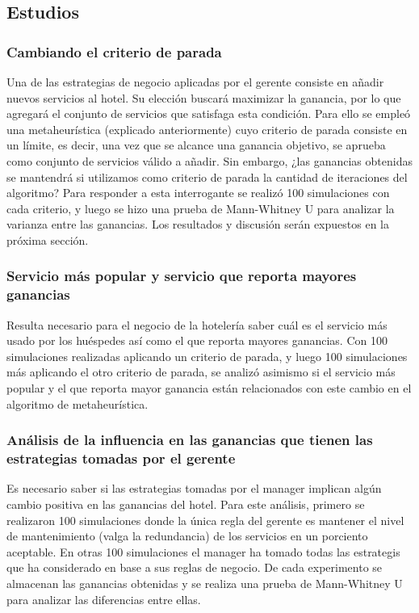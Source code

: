 \documentclass[12pt,a4paper]{article} \usepackage[spanish]{babel} \usepackage{graphicx} \usepackage{amsmath} \usepackage{amsfonts} \usepackage{amssymb} \usepackage{float} \usepackage{geometry}
\begin{document}
\subsection{Estudios}
\subsubsection{Cambiando el criterio de parada}
Una de las estrategias de negocio aplicadas por el gerente consiste en añadir nuevos servicios al hotel. Su elección buscará maximizar la ganancia, por lo que agregará el conjunto de servicios que satisfaga esta condición. Para ello se empleó una metaheurística (explicado anteriormente) cuyo criterio de parada consiste en un límite, es decir, una vez que se alcance una ganancia objetivo, se aprueba como conjunto de servicios válido a añadir. Sin embargo, ¿las ganancias obtenidas se mantendrá si utilizamos como criterio de parada la cantidad de iteraciones del algoritmo? Para responder a esta interrogante se realizó 100 simulaciones con cada criterio, y luego se hizo una prueba de Mann-Whitney U para analizar la varianza entre las ganancias. Los resultados y discusión serán expuestos en la próxima sección.\\
\subsubsection{Servicio más popular y servicio que reporta mayores ganancias}
Resulta necesario para el negocio de la hotelería saber cuál es el servicio más usado por los huéspedes así como el que reporta mayores ganancias. Con 100 simulaciones realizadas aplicando un criterio de parada, y luego 100 simulaciones más aplicando el otro criterio de parada, se analizó asimismo si el servicio más popular y el que reporta mayor ganancia están relacionados con este cambio en el algoritmo de metaheurística.
\subsubsection{Análisis de la influencia en las ganancias que tienen las estrategias tomadas por el gerente}
Es necesario saber si las estrategias tomadas por el manager implican algún cambio positiva en las ganancias del hotel. Para este análisis, primero se realizaron 100 simulaciones donde la única regla del gerente es mantener el nivel de mantenimiento (valga la redundancia) de los servicios en un porciento aceptable. En otras 100 simulaciones el manager ha tomado todas las estrategis que ha considerado en base a sus reglas de negocio. De cada experimento se almacenan las ganancias obtenidas y se realiza una prueba de Mann-Whitney U para analizar las diferencias entre ellas.\\
\end{document}
